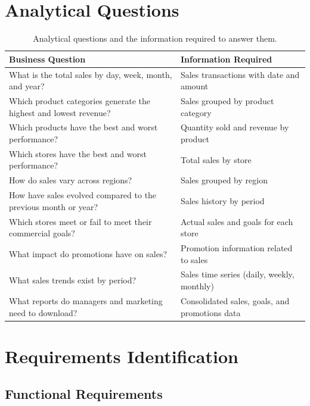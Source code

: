\documentclass[12pt,a4paper]{article}
\begin{document}
\section{Analytical Questions}

\begin{table}[H]
\centering
\small
\begin{tabular}{p{7cm} p{6.5cm}}
\toprule
\textbf{Business Question} & \textbf{Information Required}\\
\midrule
What is the total sales by day, week, month, and year? & Sales transactions with date and amount\\
Which product categories generate the highest and lowest revenue? & Sales grouped by product category\\
Which products have the best and worst performance? & Quantity sold and revenue by product\\
Which stores have the best and worst performance? & Total sales by store\\
How do sales vary across regions? & Sales grouped by region\\
How have sales evolved compared to the previous month or year? & Sales history by period\\
Which stores meet or fail to meet their commercial goals? & Actual sales and goals for each store\\
What impact do promotions have on sales? & Promotion information related to sales\\
What sales trends exist by period? & Sales time series (daily, weekly, monthly)\\
What reports do managers and marketing need to download? & Consolidated sales, goals, and promotions data\\
\bottomrule
\end{tabular}
\caption{Analytical questions and the information required to answer them.}
\end{table}

\section{Requirements Identification}

\subsection{Functional Requirements}
\end{document}
